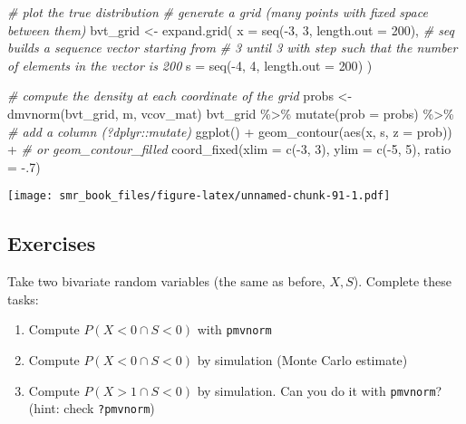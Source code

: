 \documentclass[
  oneside]{book}
\newenvironment{Shaded}{\begin{snugshade}}{\end{snugshade}}
\newcommand{\AttributeTok}[1]{\textcolor[rgb]{0.77,0.63,0.00}{#1}}
\newcommand{\CommentTok}[1]{\textcolor[rgb]{0.56,0.35,0.01}{\textit{#1}}}
\newcommand{\DecValTok}[1]{\textcolor[rgb]{0.00,0.00,0.81}{#1}}
\newcommand{\FunctionTok}[1]{\textcolor[rgb]{0.00,0.00,0.00}{#1}}
\newcommand{\NormalTok}[1]{#1}
\newcommand{\OtherTok}[1]{\textcolor[rgb]{0.56,0.35,0.01}{#1}}
\newcommand{\SpecialCharTok}[1]{\textcolor[rgb]{0.00,0.00,0.00}{#1}}
\providecommand{\tightlist}{%
  \setlength{\itemsep}{0pt}\setlength{\parskip}{0pt}}
\begin{document}
\begin{Shaded}
\begin{Highlighting}[]
\CommentTok{\# plot the true distribution}
\CommentTok{\# generate a grid (many points with fixed space between them)}
\NormalTok{bvt\_grid }\OtherTok{\textless{}{-}} \FunctionTok{expand.grid}\NormalTok{(}
  \AttributeTok{x =} \FunctionTok{seq}\NormalTok{(}\SpecialCharTok{{-}}\DecValTok{3}\NormalTok{, }\DecValTok{3}\NormalTok{, }\AttributeTok{length.out =} \DecValTok{200}\NormalTok{), }\CommentTok{\# seq builds a sequence vector starting from}
  \CommentTok{\# 3 until 3 with step such that the number of elements in the vector is 200}
  \AttributeTok{s =} \FunctionTok{seq}\NormalTok{(}\SpecialCharTok{{-}}\DecValTok{4}\NormalTok{, }\DecValTok{4}\NormalTok{, }\AttributeTok{length.out =} \DecValTok{200}\NormalTok{)}
\NormalTok{)}

\CommentTok{\# compute the density at each coordinate of the grid}
\NormalTok{probs }\OtherTok{\textless{}{-}} \FunctionTok{dmvnorm}\NormalTok{(bvt\_grid, m, vcov\_mat)}
\NormalTok{bvt\_grid }\SpecialCharTok{\%\textgreater{}\%}
  \FunctionTok{mutate}\NormalTok{(}\AttributeTok{prob =}\NormalTok{ probs) }\SpecialCharTok{\%\textgreater{}\%} \CommentTok{\# add a column (?dplyr::mutate)}
  \FunctionTok{ggplot}\NormalTok{() }\SpecialCharTok{+}
  \FunctionTok{geom\_contour}\NormalTok{(}\FunctionTok{aes}\NormalTok{(x, s, }\AttributeTok{z =}\NormalTok{ prob)) }\SpecialCharTok{+} \CommentTok{\# or geom\_contour\_filled}
  \FunctionTok{coord\_fixed}\NormalTok{(}\AttributeTok{xlim =} \FunctionTok{c}\NormalTok{(}\SpecialCharTok{{-}}\DecValTok{3}\NormalTok{, }\DecValTok{3}\NormalTok{), }\AttributeTok{ylim =} \FunctionTok{c}\NormalTok{(}\SpecialCharTok{{-}}\DecValTok{5}\NormalTok{, }\DecValTok{5}\NormalTok{), }\AttributeTok{ratio =} \SpecialCharTok{{-}}\NormalTok{.}\DecValTok{7}\NormalTok{)}
\end{Highlighting}
\end{Shaded}

\texttt{[image: smr\_book\_files/figure-latex/unnamed-chunk-91-1.pdf]}

\hypertarget{exercises-1}{%
\subsection{Exercises}\label{exercises-1}}

Take two bivariate random variables (the same as before, \(X, S\)).
Complete these tasks:

\begin{enumerate}
\def\labelenumi{\alph{enumi}.}
\tightlist
\item
  Compute \(P(X < 0 \cap S < 0)\) with \texttt{pmvnorm}
\item
  Compute \(P(X < 0 \cap S< 0)\) by simulation (Monte Carlo estimate)
\item
  Compute \(P(X > 1 \cap S < 0)\) by simulation. Can you do it with \texttt{pmvnorm}?
  (hint: check \texttt{?pmvnorm})
\end{enumerate}
\end{document}
